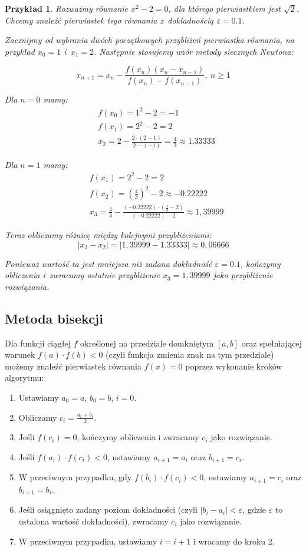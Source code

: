 \documentclass[12pt]{article}
\newtheorem{example}{Przykład}
\begin{document}
\begin{example}
Rozważmy równanie $x^2 - 2 = 0$, dla którego pierwiastkiem jest $\sqrt{2}$. Chcemy znaleźć pierwiastek tego równania z~dokładnością $\varepsilon = 0.1$.

Zacznijmy od wybrania dwóch początkowych przybliżeń pierwiastka równania, na przykład $x_0 = 1$ i~$x_1 = 2$. Następnie stosujemy wzór metody siecznych Newtona:

$$x_{n+1} = x_n - \frac{f(x_n)(x_n-x_{n-1})}{f(x_n)-f(x_{n-1})},\ n\geq1$$

Dla $n=0$ mamy:
\begin{align*}
    &f(x_0) = 1^2 - 2 = -1\\
    &f(x_1) = 2^2 - 2 = 2\\
    &x_{2} = 2 - \frac{2\cdot (2-1)}{2-(-1)} = \frac{4}{3} \approx 1.33333
\end{align*}

Dla $n=1$ mamy:
\begin{align*}
    &f(x_1) = 2^2 - 2 = 2\\
    &f(x_2) = \left(\frac{4}{3}\right)^2 - 2 \approx -0.22222\\
    &x_{3} = \frac{4}{3} - \frac{(-0.22222) \cdot \left(\frac{4}{3}-2\right)}{(-0.22222)-2} \approx 1,39999
\end{align*}

Teraz obliczamy różnicę między kolejnymi przybliżeniami:
$$|x_{3} - x_{2}| = |1,39999 - 1.33333| \approx 0,06666$$

Ponieważ wartość ta jest mniejsza niż zadana dokładność $\varepsilon = 0.1$, kończymy obliczenia i~zwracamy ostatnie przybliżenie $x_3 = 1,39999$ jako przybliżenie rozwiązania.
\end{example}

\subsection{Metoda bisekcji}
Dla funkcji ciągłej $f$ określonej na przedziale domkniętym $[a,b]$ oraz spełniającej warunek $f(a) \cdot f(b) < 0$ (czyli funkcja zmienia znak na tym przedziale) możemy znaleźć pierwiastek równania $f(x) = 0$ poprzez wykonanie kroków algorytmu:

\begin{enumerate}
\item Ustawiamy $a_0 = a$, $b_0 = b$, $i = 0$.
\item Obliczamy $c_i = \frac{a_i + b_i}{2}$.
\item Jeśli $f(c_i) = 0$, kończymy obliczenia i zwracamy $c_i$ jako rozwiązanie.
\item Jeśli $f(a_i) \cdot f(c_i) < 0$, ustawiamy $a_{i+1} = a_i$ oraz $b_{i+1} = c_i$.
\item W przeciwnym przypadku, gdy $f(b_i) \cdot f(c_i) < 0$, ustawiamy $a_{i+1} = c_i$ oraz $b_{i+1} = b_i$.
\item Jeśli osiągnięto zadany poziom dokładności (czyli $|b_i - a_i| < \varepsilon$, gdzie $\varepsilon$ to ustalona wartość dokładności), zwracamy $c_i$ jako rozwiązanie.
\item W przeciwnym przypadku, ustawiamy $i = i + 1$ i wracamy do kroku 2.
\end{enumerate}
\end{document}
